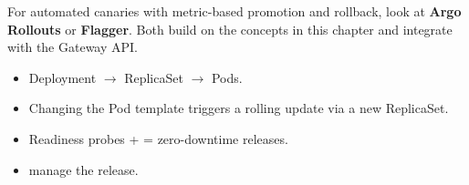 \begin{protip}
For automated canaries with metric-based promotion and rollback, look at
\textbf{Argo Rollouts} or \textbf{Flagger}. Both build on the concepts in this
chapter and integrate with the Gateway API.
\end{protip}

\begin{recap}
\begin{itemize}
  \item Deployment $\rightarrow$ ReplicaSet $\rightarrow$ Pods.
  \item Changing the Pod template triggers a rolling update via a new ReplicaSet.
  \item Readiness probes +  = zero-downtime releases.
  \item {} manage the release.
\end{itemize}
\end{recap}
